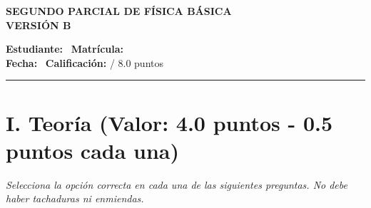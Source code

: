\documentclass[11pt,a4paper]{article}
\begin{document}
\begin{center}
    \textbf{\Large SEGUNDO PARCIAL DE FÍSICA BÁSICA} \\[0.2cm]
    \textbf{\large VERSIÓN B} \\[0.4cm]
\end{center}

\noindent \textbf{Estudiante:} \hrulefill \ \textbf{Matrícula:} \underline{\hspace{3cm}} \\[0.2cm]
\textbf{Fecha:} \underline{\hspace{4cm}} \ \textbf{Calificación:} \underline{\hspace{1.5cm}} / 8.0 puntos \\

\hrule
\section*{I. Teoría (Valor: 4.0 puntos - 0.5 puntos cada una)}
\textit{Selecciona la opción correcta en cada una de las siguientes preguntas. No debe haber tachaduras ni enmiendas.}
\end{document}
